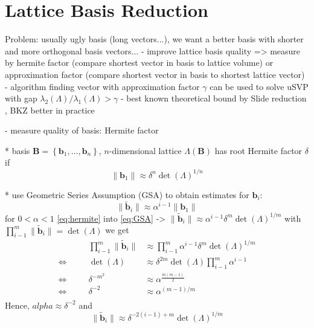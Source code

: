 
\section{Lattice Basis Reduction} %

Problem: usually ugly basis (long vectors...), we want a better basis with shorter and more orthogonal basis vectors...
- improve lattice basis quality => measure by hermite factor (compare shortest vector in basis to lattice volume) or approximation factor (compare shortest vector in basis to shortest lattice vector)
- algorithm finding vector with approximation factor $\gamma$ can be used to solve uSVP with gap $\lambda_2(\Lambda)/\lambda_1(\Lambda) > \gamma $
- best known theoretical bound by Slide reduction \cite{GN08a}, BKZ better in practice

- measure quality of basis: Hermite factor  %

* basis $\mathbf{B} = \left\{\mathbf{b}_1, \ldots, \mathbf{b}_n\right\}$, $n$-dimensional lattice $\Lambda(\mathbf{B})$ has root Hermite factor $\delta$ if
\begin{equation} \label{eq:hermite}
  \| \mathbf{b}_1 \| \approx \delta^n \det(\Lambda)^{1/n}
\end{equation}

* use Geometric Series Assumption (GSA) \cite{Sch03} to obtain estimates for $\mathbf{b}_i$: %
\begin{equation} \label{eq:GSA}
  \| \tilde{\mathbf{b}}_i \| \approx \alpha^{i-1} \| \mathbf{b}_1 \|
\end{equation}
for $0 < \alpha < 1$
\cref{eq:hermite} into \cref{eq:GSA} -> $\| \tilde{\mathbf{b}}_i \| \approx \alpha^{i-1} \delta^m \det(\Lambda)^{1/m}$
with $\prod_{i-1}^m \| \tilde{\mathbf{b}}_i \| = \det(\Lambda)$ we get
\begin{align*}
       & \quad & \prod_{i-1}^m \| \tilde{\mathbf{b}}_i \| & \approx \prod_{i-1}^m \alpha^{i-1} \delta^m \det(\Lambda)^{1/m} \\
  \iff & \quad & \det(\Lambda)                            & \approx \delta^{2m} \det(\Lambda) \prod_{i-1}^m \alpha^{i-1}    \\
  \iff & \quad & \delta^{-m^2}                            & \approx \alpha^{\frac{m(m-1)}{2}}                               \\
  \iff & \quad & \delta^{-2}                              & \approx \alpha^{(m-1)/m}                                        \\
\end{align*}
Hence, $alpha \approx \delta^{-2}$ and
\begin{equation}
  \| \tilde{\mathbf{b}}_i \| \approx \delta^{-2(i-1) + m} \det(\Lambda)^{1/m}
\end{equation}

